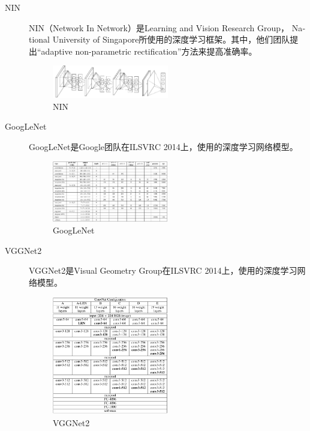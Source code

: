 \documentclass[12pt]{article}
\begin{document}
\begin{description}
\item[NIN] NIN（Network In Network）\cite{Lin:2013aa}是Learn­ing and Vi­sion Re­search Group，	Na­tion­al Uni­ver­si­ty of Sin­ga­pore所使用的深度学习框架。其中，他们团队提出``adaptive non-parametric rectification''方法来提高准确率。 
\begin{figure}[!ht]
\centering
\includegraphics[width=0.5\textwidth]{NIN}
\caption{NIN}
\end{figure}

\item[GoogLeNet] GoogLeNet\cite{simonyan2014very}是Google团队在ILSVRC 2014上，使用的深度学习网络模型。
\begin{figure}[!ht]
\centering
\includegraphics[width=0.5\textwidth]{googlenet}
\caption{GoogLeNet}
\end{figure}

\item[VGGNet2] VGGNet2\cite{szegedy2014going}是Visual Geometry Group在ILSVRC 2014上，使用的深度学习网络模型。
\begin{figure}[!ht]
\centering
\includegraphics[width=0.5\textwidth]{vggnet2}
\caption{VGGNet2}
\end{figure}


\end{description}
\end{document}
